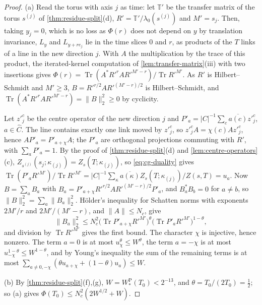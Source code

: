 \documentclass[11pt,a4paper]{amsart}
\theoremstyle{definition}
\theoremstyle{remark}
\numberwithin{equation}{section}
\DeclareMathOperator{\Tr}{Tr}        %
\newcommand{\norm}[1]{\lVert #1\rVert}     %
\newcommand{\abs}[1]{\lvert #1\rvert}      %
\newcommand{\TT}{\mathbb{T}}               %
\newcommand{\Zpart}[2]{Z(#1,#2)}           %
\newcommand{\lzero}{\lambda_0}             %
\begin{document}
\begin{proof}
(a) Read the torus with axis $j$ as time: let $\TT'$ be the transfer matrix of the torus $s^{(j)}$ of \cref{thm:residue-split}\textup{(d)}, $R'=\TT'/\lzero(s^{(j)})$ and $M'=s_j$. Then, taking $y_j=0$, which is no loss as $\Phi(r)$ does not depend on $y$ by translation invariance, $L_y$ and $L_{y+re_j}$ lie in the time slices $0$ and $r$, as products of the $T$ links of a line in the new direction $j$. With $A$ the multiplication by the trace of this product, the iterated-kernel computation of \cref{lem:transfer-matrix}\textup{(iii)} with two insertions gives $\Phi(r)=\Tr(A^*R'^rAR'^{M'-r})/\Tr R'^{M'}$. As $R'$ is Hilbert--Schmidt and $M'\ge3$, $B=R'^{r/2}AR'^{(M'-r)/2}$ is Hilbert--Schmidt, and $\Tr(A^*R'^rAR'^{M'-r})=\norm{B}_2^2\ge0$ by cyclicity.

Let $z'^c_j$ be the centre operator of the new direction $j$ and $P'_a=\abs{C}^{-1}\sum_c\overline{a(c)}z'^c_j$, $a\in\widehat C$. The line contains exactly one link moved by $z'^c_j$, so $z'^c_jA=\chi(c)Az'^c_j$, hence $AP'_a=P'_{a+\chi}A$; the $P'_a$ are orthogonal projections commuting with $R'$, with $\sum_aP'_a=1$. By the proof of \cref{thm:residue-split}\textup{(d)} and \cref{lem:centre-operators}\textup{(c)}, $Z_{s^{(j)}}(s_j;\kappa_{(j)})=Z_s(T;\kappa_{(j)})$, so \eqref{eq:cg-duality} gives $\Tr(P'_aR'^{M'})/\Tr R'^{M'}=\abs{C}^{-1}\sum_\kappa\overline{a(\kappa)}Z_s(T;\kappa_{(j)})/\Zpart{s}{T}=u_a$. Now $B=\sum_aB_a$ with $B_a=P'_{a+\chi}R'^{r/2}AR'^{(M'-r)/2}P'_a$, and $B_a^*B_b=0$ for $a\ne b$, so $\norm{B}_2^2=\sum_a\norm{B_a}_2^2$. H\"older's inequality for Schatten norms with exponents $2M'/r$ and $2M'/(M'-r)$, and $\norm{A}\le N_c$, give
\[
\norm{B_a}_2^2\le N_c^2\bigl(\Tr P'_{a+\chi}R'^{M'}\bigr)^{\theta}\bigl(\Tr P'_aR'^{M'}\bigr)^{1-\theta},
\]
and division by $\Tr R'^{M'}$ gives the first bound. The character $\chi$ is injective, hence nonzero. The term $a=0$ is at most $u_\chi^\theta\le W^\theta$, the term $a=-\chi$ is at most $u_{-\chi}^{1-\theta}\le W^{1-\theta}$, and by Young's inequality the sum of the remaining terms is at most $\sum_{a\ne0,-\chi}(\theta u_{a+\chi}+(1-\theta)u_a)\le W$.

(b) By \cref{thm:residue-split}\textup{(f),(g)}, $W=W^{\mathrm P}_*(T_0)<2^{-13}$, and $\theta=T_0/(2T_0)=\frac12$; so (a) gives $\Phi(T_0)\le N_c^2(2W^{1/2}+W)$.


\end{proof}
\end{document}
